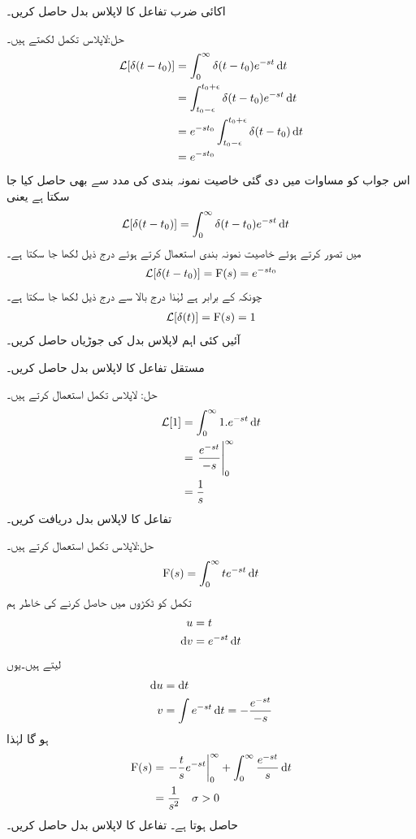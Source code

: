 اکائی ضرب تفاعل کا لاپلاس بدل حاصل کریں۔

حل:لاپلاس تکمل لکھتے ہیں۔
\begin{align*}
\Laplace[\delta(t-t_0)]&=\int_0^{\infty} \delta(t-t_0) e^{-st} \dif t\\
&=\int_{t_0-\epsilon}^{t_0+\epsilon} \delta(t-t_0) e^{-st} \dif t\\
&=e^{-s t_0} \int_{t_0-\epsilon}^{t_0+\epsilon} \delta(t-t_0) \dif t\\
&=e^{-st_0}
\end{align*}
اس جواب  کو مساوات  میں دی گئی خاصیت نمونہ بندی کی مدد سے بھی حاصل کیا جا سکتا ہے یعنی
  \begin{align*}
\Laplace[\delta(t-t_0)]&=\int_0^{\infty} \delta(t-t_0) e^{-st} \dif t
\end{align*}
میں  تصور کرتے ہوئے خاصیت نمونہ بندی استعمال کرتے  ہوئے درج ذیل لکھا جا سکتا ہے۔
\begin{align}
\mathcal{L}[\delta(t-t_0)]={{\textup{F}}}(s)=e^{-st_0}
\end{align}
چونکہ  کے برابر ہے لہٰذا درج بالا سے درج ذیل لکھا جا سکتا ہے۔
\begin{align}
\mathcal{L}[\delta(t)]={{\textup{F}}}(s)=1
\end{align}
آئیں کئی اہم لاپلاس بدل کی جوڑیاں حاصل کریں۔

مستقل تفاعل  کا لاپلاس بدل حاصل کریں۔

حل: لاپلاس تکمل استعمال کرتے ہیں۔
\begin{align*}
\Laplace[1]&=\int_0^{\infty} 1.e^{-st}\dif t\\
&=\left.\frac{e^{-st}}{-s} \right|_0^{\infty}\\
&=\frac{1}{s}
\end{align*}
تفاعل  کا لاپلاس بدل دریافت کریں۔

حل:لاپلاس تکمل استعمال کرتے ہیں۔
\begin{align*}
\bF(s)=\int_0^{\infty} t e^{-st} \dif t
\end{align*}
تکمل کو ٹکڑوں میں حاصل کرنے کی خاطر ہم 
\begin{align*}
u&=t\\
\dif v&=e^{-st} \dif t
\end{align*}
 لیتے ہیں۔یوں
\begin{align*}
\dif u &= \dif t\\
v&=\int e^{-st} \dif t=-\frac{e^{-st}}{-s}
\end{align*}
ہو گا لہٰذا
\begin{gather}
\begin{aligned}
\bF(s)&=\left. -\frac{t}{s}e^{-st}\right|_0^{\infty}+\int_0^{\infty} \frac{e^{-st}}{s} \dif t\\
&=\frac{1}{s^2} \quad \sigma>0
\end{aligned}
\end{gather}
حاصل ہوتا ہے۔
تفاعل  کا لاپلاس بدل حاصل کریں۔

